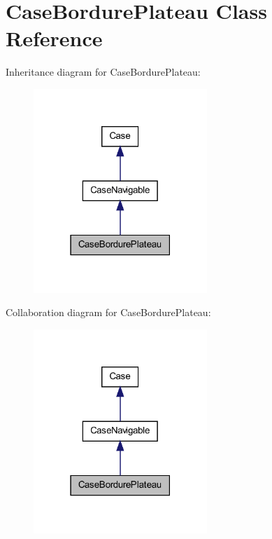 \hypertarget{class_case_bordure_plateau}{
\section{CaseBordurePlateau Class Reference}
\label{class_case_bordure_plateau}
}


Inheritance diagram for CaseBordurePlateau:
\nopagebreak
\begin{figure}[H]
\begin{center}
\leavevmode
\includegraphics[width=186pt]{class_case_bordure_plateau__inherit__graph}
\end{center}
\end{figure}


Collaboration diagram for CaseBordurePlateau:
\nopagebreak
\begin{figure}[H]
\begin{center}
\leavevmode
\includegraphics[width=186pt]{class_case_bordure_plateau__coll__graph}
\end{center}
\end{figure}
